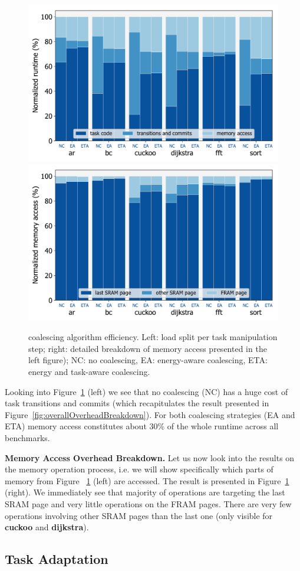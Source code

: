 \begin{figure}
	\centering
	\includegraphics[width=0.49\columnwidth]{figures/overallOverhead}
	\includegraphics[width=0.49\columnwidth]{figures/memAccess}
	\caption{\sys coalescing algorithm efficiency. Left: load split per task manipulation step; right: detailed breakdown of memory access presented in the left figure); NC: no coalescing, EA: energy-aware coalescing, ETA: energy and task-aware coalescing. }
	\label{fig:coalEfficiency}
\end{figure}

Looking into Figure~\ref{fig:coalEfficiency} (left) we see that no coalescing (NC) \sys has a huge cost of task transitions and commits (which recapitulates the result presented in Figure~\ref{fig:overallOverheadBreakdown}). For both coalescing strategies (EA and ETA) memory access constitutes about 30\% of the whole \sys runtime across all benchmarks.

\textbf{\sys Memory Access Overhead Breakdown.} Let us now look into the results on the \sys memory operation process, i.e. we will show specifically which parts of memory from Figure~
\ref{fig:coalEfficiency} (left) are accessed. The result is presented in Figure~\ref{fig:coalEfficiency} (right). We immediately see that majority of operations are targeting the last SRAM page and very little operations on the FRAM pages. There are very few operations involving other SRAM pages than the last one (only visible for \textbf{cuckoo} and \textbf{dijkstra}). 

\subsection{\sys Task Adaptation}
\label{sec:result_coalescing}

